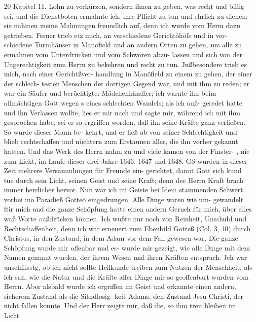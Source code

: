 
20 Kapitel 11.
Lohn zu verkürzen, sondern ihnen zu geben, was recht und billig
sei, und die Dienstboten ermahnte ich, ihre Pflicht zu tun und
ehrlich zu dienen; sie nahmen meine Mahnungen freundlich auf,
denn ich wurde vom Herm dazu getrieben.
Ferner trieb etz mich, an verschiedene Gerichtöhöfe und in ver-
schiedene Turmhäuser in Manöfield und an andern Orten zu gehen,
um alle zu ermahnen vom Unterdrücken und vom Schwören abzu-
lassen und sich von der Ungerechtigkeit zum Herrn zu bekehren und
recht zu tun. Jnßbesondere trieb es mich, nach einer Gerichtßver-
handlung in Manöfield zu einem zu gehen, der einer der schlech-
testen Menschen der dortigen Gegend war, und mit ihm zu reden;
er war ein Säufer und berüchtigte: Mädchenhändler; ich warnte ihn
beim allmächtigen Gott wegen s eines schlechten Wandels; als ich auß-
geredet hatte und ihn Verlassen wollte, lies er mir nach und sagte
mir, während ich mit ihm gesprochen habe, sei er so ergriffen worden,
daß ihn seine Kräfte ganz verließen. So wurde dieser Mann be-
kehrt, und er ließ ab von seiner Schlechtigkeit und blieb rechtschaffen
und nüchtern zum Erstaunen aller, die ihn vorher gekannt hatten.
Und das Werk des Herrn nahm zu und viele kamen von der Finster- ,
nie zum Licht, im Laufe dieser drei Jahre 1646, 1647 und 1648.
GS wurden in dieser Zeit mehrere Versammlungen für Freunde ein-
gerichtet, damit Gott sich kund tue durch sein Licht, seinen Geist
und seine Kraft; denn dee Herrn Kraft brach immer herrlicher hervor.
Nun war ich ini Geiste bei Idem stammenden Schwert vorbei
inö Paradieß Gotteö eingedrungen. Alle Dinge waren wie um-
gewandelt ftir mich und die ganze Schöpfung hatte einen andern
Geruch für mich, über alles waß Worte außdrücken können. Ich
wußte nur noch von Reinheit, Unschuld und Rechtschaffenheit, denn
ich war erneuert zum Ebenbild Gotteß (Col. 3, 10) durch Christus,
in den Zustand, in dem Adam vor dem Fall gewesen war. Die
ganze Schöpfung wurde mir offenbar und es- wurde mir gezeigt,
wie alle Dinge mit dem Namen genannt wurden, der ihrem
Wesen und ihren Kräften entsprach. Jch war unschliisstg, ob ich
nicht sollte Heilkunde treiben zum Nutzen der Menschheit, als ich
sah, wie die Natur und die Kräfte aller Dinge mir so geoffenbart
wurden vom Herrn. Aber alsbald wurde ich ergriffen im Geist
und erkannte einen andern, sicherem Zustand als die Sitndlosig-
keit Adams, den Zustand Jesu Christi, der nicht fallen konnte.
Und der Herr zeigte mir, daß die, so ihm treu bleiben im Licht


